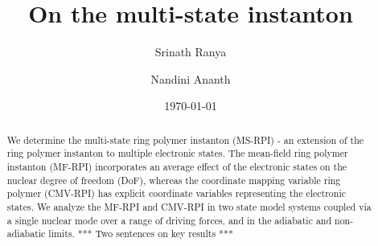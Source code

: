 \documentclass[%
 aip,
 jmp,%
 amsmath,amssymb,
reprint,%
]{revtex4-1}
\begin{document}

\title[Multi-state instantons]{On the multi-state instanton}%

\author{Srinath Ranya}
\author{Nandini Ananth}%


\date{\today}%

\begin{abstract}
We determine the multi-state ring polymer instanton (MS-RPI) - an extension of the ring polymer instanton to multiple electronic states. The mean-field ring polymer instanton (MF-RPI) incorporates an average effect of the electronic states on the nuclear degree of freedom (DoF), whereas the coordinate mapping variable ring polymer (CMV-RPI) has explicit coordinate variables representing the electronic states. We analyze the MF-RPI and CMV-RPI in two state model systems coupled via a single nuclear mode over a range of driving forces, and in the adiabatic and non-adiabatic limits. *** Two sentences on key results ***
\end{abstract}

\maketitle


%
\end{document}
